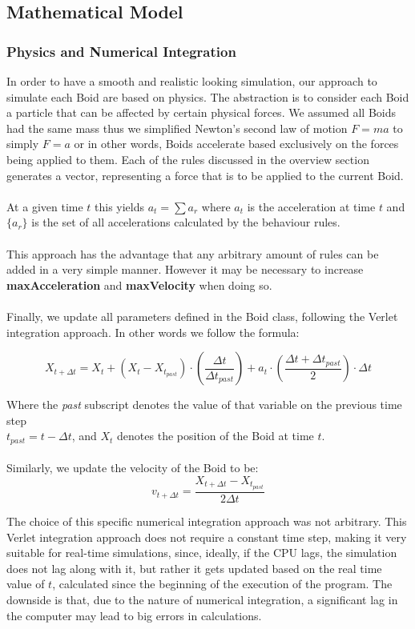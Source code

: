\documentclass[12pt]{article}
\begin{document}
\subsection{Mathematical Model}
\subsubsection{Physics and Numerical Integration}
In order to have a smooth and realistic looking simulation, our approach to simulate each Boid are based on physics. The abstraction is to consider each Boid a particle that can be affected by certain physical forces. We assumed all Boids had the same mass thus we simplified Newton's second law of motion $F=ma$ to simply $F=a$ or in other words, Boids accelerate based exclusively on the forces being applied to them. Each of the rules discussed in the overview section generates a vector, representing a force that is to be applied to the current Boid. 
\\ \\
At a given time $t$ this yields $a_t = \sum a_r$ where $a_t$ is the acceleration at time $t$ and $\{a_r\}$ is the set of all accelerations calculated by the behaviour rules. 
\\ \\
This approach has the advantage that any arbitrary amount of rules can be added in a very simple manner. However it may be necessary to increase \textbf{maxAcceleration} and \textbf{maxVelocity}
when doing so.
\\ \\
Finally, we update all parameters defined in the Boid class, following the Verlet integration approach. In other words we follow the formula:

$$X_{t+\Delta t} = X_t + (X_t-X_{t_{past}})\cdot(\frac{\Delta t}{\Delta t_{past}}) + a_t\cdot(\frac{\Delta t + \Delta t_{past}}{2})\cdot\Delta t$$

Where the \textit{past} subscript denotes the value of that variable on the previous time step\\
$t_{past}=t-\Delta t$, and $X_t$ denotes the position of the Boid at time $t$.
\\ \\
Similarly, we update the velocity of the Boid to be: 
$$v_{t+\Delta t} = \frac{X_{t+\Delta t} - X_{t_{past}}}{2\Delta t}$$

The choice of this specific numerical integration approach was not arbitrary. This Verlet integration approach does not require a constant time step, making it very suitable for real-time simulations, since, ideally, if the CPU lags, the simulation does not lag along with it, but rather it gets updated based on the real time value of $t$, calculated since the beginning of the execution of the program. The downside is that, due to the nature of numerical integration, a significant lag in the computer may lead to big errors in calculations.
\end{document}
